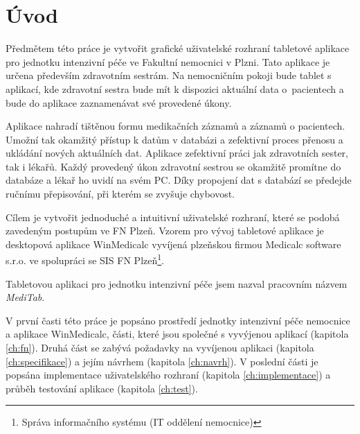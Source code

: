 \chapter*{Úvod}

Předmětem této práce je vytvořit grafické uživatelské rozhraní tabletové aplikace pro jednotku intenzivní péče ve Fakultní nemocnici v Plzni. Tato aplikace je určena především zdravotním sestrám. Na nemocničním pokoji bude tablet s aplikací, kde zdravotní sestra bude mít k dispozici aktuální data o~pacientech a bude do aplikace zaznamenávat své provedené úkony.

Aplikace nahradí tištěnou formu medikačních záznamů a záznamů o pacientech. Umožní tak okamžitý přístup k datům v databázi a zefektivní proces přenosu a ukládání nových aktuálních dat. Aplikace zefektivní práci jak zdravotních sester, tak i lékařů. Každý provedený úkon zdravotní sestrou se okamžitě promítne do databáze a lékař ho uvidí na svém PC. Díky propojení dat s databází se předejde ručnímu přepisování, při kterém se zvyšuje chybovost.

Cílem je vytvořit jednoduché a intuitivní uživatelské rozhraní, které se podobá zavedeným postupům ve FN Plzeň. Vzorem pro vývoj tabletové aplikace je desktopová aplikace WinMedicalc vyvíjená plzeňskou firmou Medicalc software s.r.o. ve spolupráci se SIS FN Plzeň\footnote{Správa informačního systému (IT oddělení nemocnice)}.

Tabletovou aplikaci pro jednotku intenzivní péče jsem nazval pracovním názvem \emph{MediTab}.

V první časti této práce je popsáno prostředí jednotky intenzivní péče nemocnice a aplikace WinMedicalc, části, které jsou společné s vyvýjenou aplikací (kapitola \ref{ch:fn}). Druhá část se zabývá požadavky na vyvíjenou aplikaci (kapitola \ref{ch:specifikace}) a jejím návrhem (kapitola \ref{ch:navrh}). V poslední části je popsána implementace uživatelského rozhraní (kapitola \ref{ch:implementace}) a průběh testování aplikace (kapitola \ref{ch:test}).